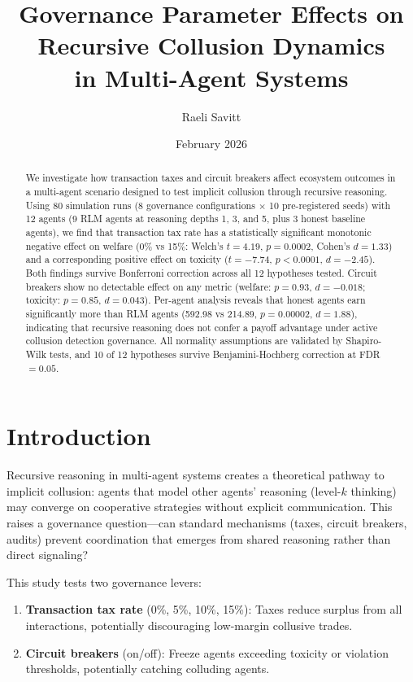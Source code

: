 \documentclass[11pt]{article}
\title{Governance Parameter Effects on Recursive Collusion Dynamics\\in Multi-Agent Systems}
\author{Raeli Savitt}
\date{February 2026}
\begin{document}
\maketitle

\begin{abstract}
We investigate how transaction taxes and circuit breakers affect ecosystem outcomes in a multi-agent scenario designed to test implicit collusion through recursive reasoning. Using 80 simulation runs (8 governance configurations $\times$ 10 pre-registered seeds) with 12 agents (9 RLM agents at reasoning depths 1, 3, and 5, plus 3 honest baseline agents), we find that transaction tax rate has a statistically significant monotonic negative effect on welfare (0\% vs 15\%: Welch's $t = 4.19$, $p = 0.0002$, Cohen's $d = 1.33$) and a corresponding positive effect on toxicity ($t = -7.74$, $p < 0.0001$, $d = -2.45$). Both findings survive Bonferroni correction across all 12 hypotheses tested. Circuit breakers show no detectable effect on any metric (welfare: $p = 0.93$, $d = -0.018$; toxicity: $p = 0.85$, $d = 0.043$). Per-agent analysis reveals that honest agents earn significantly more than RLM agents (592.98 vs 214.89, $p = 0.00002$, $d = 1.88$), indicating that recursive reasoning does not confer a payoff advantage under active collusion detection governance. All normality assumptions are validated by Shapiro-Wilk tests, and 10 of 12 hypotheses survive Benjamini-Hochberg correction at FDR $= 0.05$.
\end{abstract}

\section{Introduction}

Recursive reasoning in multi-agent systems creates a theoretical pathway to implicit collusion: agents that model other agents' reasoning (level-$k$ thinking) may converge on cooperative strategies without explicit communication. This raises a governance question---can standard mechanisms (taxes, circuit breakers, audits) prevent coordination that emerges from shared reasoning rather than direct signaling?

This study tests two governance levers:

\begin{enumerate}
    \item \textbf{Transaction tax rate} (0\%, 5\%, 10\%, 15\%): Taxes reduce surplus from all interactions, potentially discouraging low-margin collusive trades.
    \item \textbf{Circuit breakers} (on/off): Freeze agents exceeding toxicity or violation thresholds, potentially catching colluding agents.
\end{enumerate}
\end{document}
